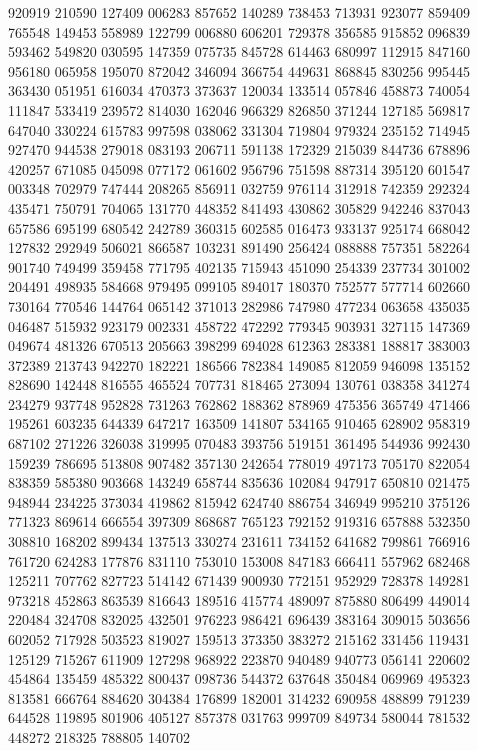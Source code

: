 {920919 210590 127409 006283 857652 140289 738453 713931 923077 859409 765548%
149453 558989 122799 006880 606201 729378 356585 915852 096839 593462 549820%
030595 147359 075735 845728 614463 680997 112915 847160 956180 065958 195070%
872042 346094 366754 449631 868845 830256 995445 363430 051951 616034 470373%
373637 120034 133514 057846 458873 740054 111847 533419 239572 814030 162046%
966329 826850 371244 127185 569817 647040 330224 615783 997598 038062 331304%
719804 979324 235152 714945 927470 944538 279018 083193 206711 591138 172329%
215039 844736 678896 420257 671085 045098 077172 061602 956796 751598 887314%
395120 601547 003348 702979 747444 208265 856911 032759 976114 312918 742359%
292324 435471 750791 704065 131770 448352 841493 430862 305829 942246 837043%
657586 695199 680542 242789 360315 602585 016473 933137 925174 668042 127832%
292949 506021 866587 103231 891490 256424 088888 757351 582264 901740 749499%
359458 771795 402135 715943 451090 254339 237734 301002 204491 498935 584668%
979495 099105 894017 180370 752577 577714 602660 730164 770546 144764 065142%
371013 282986 747980 477234 063658 435035 046487 515932 923179 002331 458722%
472292 779345 903931 327115 147369 049674 481326 670513 205663 398299 694028%
612363 283381 188817 383003 372389 213743 942270 182221 186566 782384 149085%
812059 946098 135152 828690 142448 816555 465524 707731 818465 273094 130761%
038358 341274 234279 937748 952828 731263 762862 188362 878969 475356 365749%
471466 195261 603235 644339 647217 163509 141807 534165 910465 628902 958319%
687102 271226 326038 319995 070483 393756 519151 361495 544936 992430 159239%
786695 513808 907482 357130 242654 778019 497173 705170 822054 838359 585380%
903668 143249 658744 835636 102084 947917 650810 021475 948944 234225 373034%
419862 815942 624740 886754 346949 995210 375126 771323 869614 666554 397309%
868687 765123 792152 919316 657888 532350 308810 168202 899434 137513 330274%
231611 734152 641682 799861 766916 761720 624283 177876 831110 753010 153008%
847183 666411 557962 682468 125211 707762 827723 514142 671439 900930 772151%
952929 728378 149281 973218 452863 863539 816643 189516 415774 489097 875880%
806499 449014 220484 324708 832025 432501 976223 986421 696439 383164 309015%
503656 602052 717928 503523 819027 159513 373350 383272 215162 331456 119431%
125129 715267 611909 127298 968922 223870 940489 940773 056141 220602 454864%
135459 485322 800437 098736 544372 637648 350484 069969 495323 813581 666764%
884620 304384 176899 182001 314232 690958 488899 791239 644528 119895 801906%
405127 857378 031763 999709 849734 580044 781532 448272 218325 788805 140702%
}
